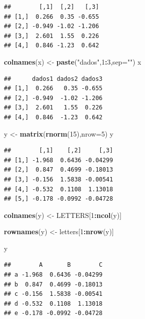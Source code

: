 \documentclass[
]{book}
\newenvironment{Shaded}{\begin{snugshade}}{\end{snugshade}}
\newcommand{\AttributeTok}[1]{\textcolor[rgb]{0.13,0.29,0.53}{#1}}
\newcommand{\DecValTok}[1]{\textcolor[rgb]{0.00,0.00,0.81}{#1}}
\newcommand{\FunctionTok}[1]{\textcolor[rgb]{0.13,0.29,0.53}{\textbf{#1}}}
\newcommand{\NormalTok}[1]{#1}
\newcommand{\OtherTok}[1]{\textcolor[rgb]{0.56,0.35,0.01}{#1}}
\newcommand{\SpecialCharTok}[1]{\textcolor[rgb]{0.81,0.36,0.00}{\textbf{#1}}}
\newcommand{\StringTok}[1]{\textcolor[rgb]{0.31,0.60,0.02}{#1}}
\begin{document}
\begin{verbatim}
##        [,1]  [,2]   [,3]
## [1,]  0.266  0.35 -0.655
## [2,] -0.949 -1.02 -1.206
## [3,]  2.601  1.55  0.226
## [4,]  0.846 -1.23  0.642
\end{verbatim}

\begin{Shaded}
\begin{Highlighting}[]
\FunctionTok{colnames}\NormalTok{(x) }\OtherTok{\textless{}{-}} \FunctionTok{paste}\NormalTok{(}\StringTok{"dados"}\NormalTok{,}\DecValTok{1}\SpecialCharTok{:}\DecValTok{3}\NormalTok{,}\AttributeTok{sep=}\StringTok{""}\NormalTok{)}
\NormalTok{x}
\end{Highlighting}
\end{Shaded}

\begin{verbatim}
##      dados1 dados2 dados3
## [1,]  0.266   0.35 -0.655
## [2,] -0.949  -1.02 -1.206
## [3,]  2.601   1.55  0.226
## [4,]  0.846  -1.23  0.642
\end{verbatim}

\begin{Shaded}
\begin{Highlighting}[]
\NormalTok{y }\OtherTok{\textless{}{-}} \FunctionTok{matrix}\NormalTok{(}\FunctionTok{rnorm}\NormalTok{(}\DecValTok{15}\NormalTok{),}\AttributeTok{nrow=}\DecValTok{5}\NormalTok{)}
\NormalTok{y }
\end{Highlighting}
\end{Shaded}

\begin{verbatim}
##        [,1]    [,2]     [,3]
## [1,] -1.968  0.6436 -0.04299
## [2,]  0.847  0.4699 -0.18013
## [3,] -0.156  1.5838 -0.00541
## [4,] -0.532  0.1108  1.13018
## [5,] -0.178 -0.0992 -0.04728
\end{verbatim}

\begin{Shaded}
\begin{Highlighting}[]
\FunctionTok{colnames}\NormalTok{(y) }\OtherTok{\textless{}{-}}\NormalTok{ LETTERS[}\DecValTok{1}\SpecialCharTok{:}\FunctionTok{ncol}\NormalTok{(y)]}

\FunctionTok{rownames}\NormalTok{(y) }\OtherTok{\textless{}{-}}\NormalTok{ letters[}\DecValTok{1}\SpecialCharTok{:}\FunctionTok{nrow}\NormalTok{(y)]}

\NormalTok{y}
\end{Highlighting}
\end{Shaded}

\begin{verbatim}
##        A       B        C
## a -1.968  0.6436 -0.04299
## b  0.847  0.4699 -0.18013
## c -0.156  1.5838 -0.00541
## d -0.532  0.1108  1.13018
## e -0.178 -0.0992 -0.04728
\end{verbatim}
\end{document}
